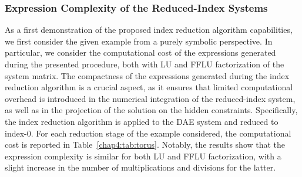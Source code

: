 \subsubsection{Expression Complexity of the Reduced-Index Systems}
\label{chap4:sec:daes_complexity}

As a first demonstration of the proposed index reduction algorithm capabilities, we first consider the given example from a purely symbolic perspective. In particular, we consider the computational cost of the expressions generated during the presented procedure, both with \ac{LU} and \ac{FFLU} factorization of the system matrix. The compactness of the expressions generated during the index reduction algorithm is a crucial aspect, as it ensures that limited computational overhead is introduced in the numerical integration of the reduced-index system, as well as in the projection of the solution on the hidden constraints. Specifically, the index reduction algorithm is applied to the \ac{DAE} system and reduced to index-0. For each reduction stage of the example considered, the computational cost is reported in Table~\ref{chap4:tab:torus}. Notably, the results show that the expression complexity is similar for both \ac{LU} and \ac{FFLU} factorization, with a slight increase in the number of multiplications and divisions for the latter.

